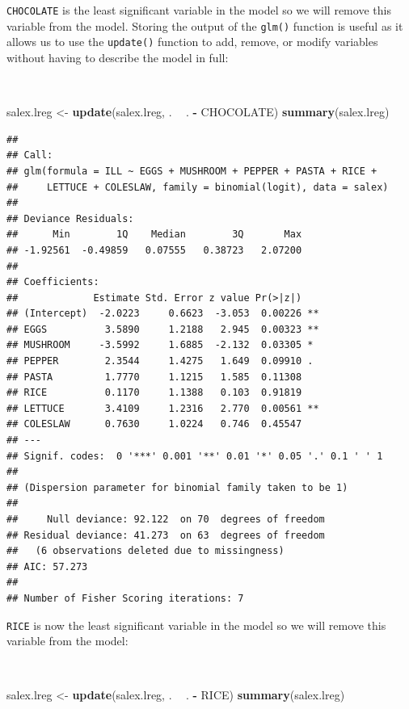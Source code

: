 \documentclass[12pt,a4paper]{book}
\newenvironment{Shaded}{\begin{snugshade}}{\end{snugshade}}
\newcommand{\KeywordTok}[1]{\textcolor[rgb]{0.13,0.29,0.53}{\textbf{#1}}}
\newcommand{\NormalTok}[1]{#1}
\newcommand{\OperatorTok}[1]{\textcolor[rgb]{0.81,0.36,0.00}{\textbf{#1}}}
\newcommand{\StringTok}[1]{\textcolor[rgb]{0.31,0.60,0.02}{#1}}
\theoremstyle{definition}
\theoremstyle{definition}
\theoremstyle{definition}
\theoremstyle{remark}
\begin{document}
\newpage

\texttt{CHOCOLATE} is the least significant variable in the model so we
will remove this variable from the model. Storing the output of the
\texttt{glm()} function is useful as it allows us to use the
\texttt{update()} function to add, remove, or modify variables without
having to describe the model in full:

~

\begin{Shaded}
\begin{Highlighting}[]
\NormalTok{salex.lreg <-}\StringTok{ }\KeywordTok{update}\NormalTok{(salex.lreg, . }\OperatorTok{~}\StringTok{ }\NormalTok{. }\OperatorTok{-}\StringTok{ }\NormalTok{CHOCOLATE)}
\KeywordTok{summary}\NormalTok{(salex.lreg)}
\end{Highlighting}
\end{Shaded}

\begin{verbatim}
## 
## Call:
## glm(formula = ILL ~ EGGS + MUSHROOM + PEPPER + PASTA + RICE + 
##     LETTUCE + COLESLAW, family = binomial(logit), data = salex)
## 
## Deviance Residuals: 
##      Min        1Q    Median        3Q       Max  
## -1.92561  -0.49859   0.07555   0.38723   2.07200  
## 
## Coefficients:
##             Estimate Std. Error z value Pr(>|z|)   
## (Intercept)  -2.0223     0.6623  -3.053  0.00226 **
## EGGS          3.5890     1.2188   2.945  0.00323 **
## MUSHROOM     -3.5992     1.6885  -2.132  0.03305 * 
## PEPPER        2.3544     1.4275   1.649  0.09910 . 
## PASTA         1.7770     1.1215   1.585  0.11308   
## RICE          0.1170     1.1388   0.103  0.91819   
## LETTUCE       3.4109     1.2316   2.770  0.00561 **
## COLESLAW      0.7630     1.0224   0.746  0.45547   
## ---
## Signif. codes:  0 '***' 0.001 '**' 0.01 '*' 0.05 '.' 0.1 ' ' 1
## 
## (Dispersion parameter for binomial family taken to be 1)
## 
##     Null deviance: 92.122  on 70  degrees of freedom
## Residual deviance: 41.273  on 63  degrees of freedom
##   (6 observations deleted due to missingness)
## AIC: 57.273
## 
## Number of Fisher Scoring iterations: 7
\end{verbatim}

\newpage

\texttt{RICE} is now the least significant variable in the model so we
will remove this variable from the model:

~

\begin{Shaded}
\begin{Highlighting}[]
\NormalTok{salex.lreg <-}\StringTok{ }\KeywordTok{update}\NormalTok{(salex.lreg, . }\OperatorTok{~}\StringTok{ }\NormalTok{. }\OperatorTok{-}\StringTok{ }\NormalTok{RICE)}
\KeywordTok{summary}\NormalTok{(salex.lreg)}
\end{Highlighting}
\end{Shaded}
\end{document}
